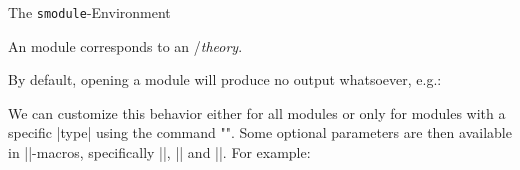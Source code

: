 \begin{sfragment}{The \texttt{smodule}-Environment}
    \begin{mmtbox}
        An \sTeX module corresponds to an \mmt/\omdoc \emph{theory}.
    \end{mmtbox}

    By default, opening a module will produce no output whatsoever,
    e.g.:

    \begin{function}{\stexpatchmodule}
        We can customize this behavior either for all modules or
        only for modules with a specific |type| using the command
        \stexcode"".
        Some optional parameters are then available in |\smodule*|-macros,
        specifically |\smoduletitle|, |\smoduletype| and |\smoduleid|.
        For example:


    \end{function}
\end{sfragment}